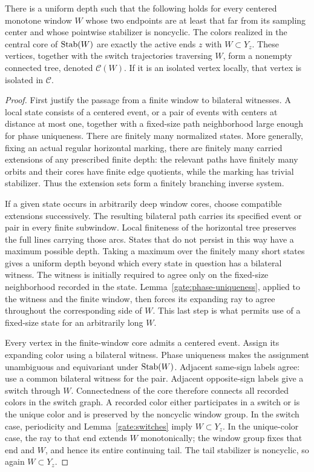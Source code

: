 \begin{lemma}\label{gate:local-switch-tree}
There is a uniform depth such that the following holds for every centered
monotone window $W$ whose two endpoints are at least that far from its
sampling center and whose pointwise stabilizer is noncyclic.  The colors
realized in the central core of $\operatorname{Stab}(W)$ are exactly the active ends $z$
with $W\subset Y_z$.  These vertices, together with the switch trajectories
traversing $W$, form a nonempty connected tree, denoted $\mathcal C(W)$.
If it is an isolated vertex locally, that vertex is isolated in
$\mathcal C$.
\end{lemma}
\begin{proof}
First justify the passage from a finite window to bilateral witnesses.
A local state consists of a centered event, or a pair of events with centers
at distance at most one, together with a fixed-size path neighborhood
large enough for phase uniqueness.  There are finitely many normalized
states.  More generally, fixing an actual regular horizontal marking,
there are finitely many carried extensions of any prescribed finite
depth: the relevant paths have finitely many orbits and their cores have
finite edge quotients, while the marking has trivial stabilizer.  Thus
the extension sets form a finitely branching inverse system.

If a given state occurs in arbitrarily deep window cores, choose compatible
extensions successively.  The resulting bilateral path carries its
specified event or pair in every finite subwindow.  Local finiteness of
the horizontal tree preserves the full lines carrying those arcs.  States
that do not persist in this way have a maximum possible depth.  Taking
a maximum over the finitely many short states gives a uniform depth beyond
which every state in question has a bilateral witness.  The witness is
initially required to agree only on the fixed-size neighborhood recorded
in the state.  Lemma~\ref{gate:phase-uniqueness}, applied to the witness
and the finite window, then forces its expanding ray to agree throughout
the corresponding side of $W$.  This last step is what permits use of a
fixed-size state for an arbitrarily long $W$.

Every vertex in the finite-window core admits a centered event.  Assign
its expanding color using a bilateral witness.  Phase uniqueness makes
the assignment unambiguous and equivariant under $\operatorname{Stab}(W)$.  Adjacent
same-sign labels agree: use a common bilateral witness for the pair.
Adjacent opposite-sign labels give a switch through $W$.  Connectedness
of the core therefore connects all recorded colors in the switch graph.
A recorded color either participates in a switch or is the unique color
and is preserved by the noncyclic window group.  In the switch case,
periodicity and Lemma~\ref{gate:switches} imply $W\subset Y_z$.  In the
unique-color case, the ray to that end extends $W$ monotonically; the
window group fixes that end and $W$, and hence its entire continuing tail.
The tail stabilizer is noncyclic, so again $W\subset Y_z$.


\end{proof}

